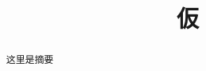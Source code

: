 \documentclass{myclass}
\title{仮}
\begin{document}
\maketitle
\begin{abstract}
这里是摘要
\end{abstract}






\end{document}
